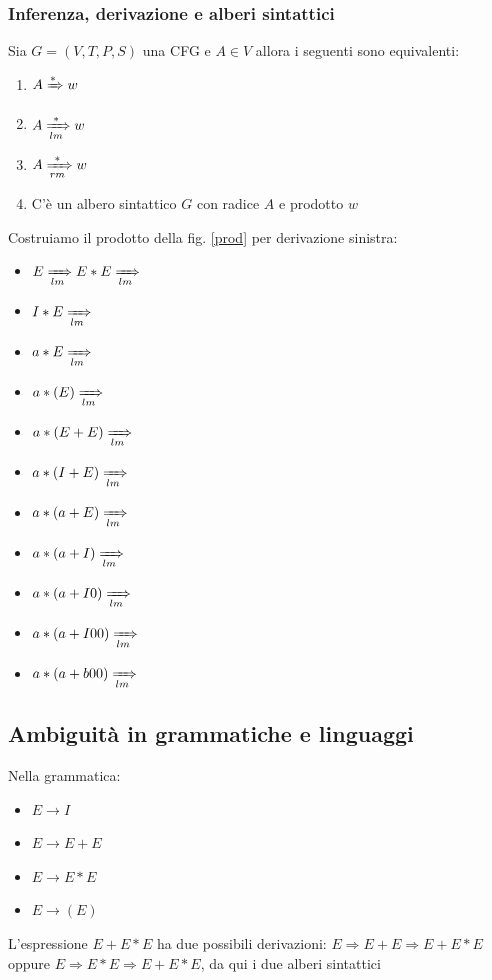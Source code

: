 \documentclass[12pt]{article}
\begin{document}
\subsubsection{Inferenza, derivazione e alberi sintattici}
Sia $G=(V,T,P,S)$ una CFG e $A \in V$ allora i seguenti sono equivalenti: 
\begin{enumerate}
  \item $A \xRightarrow[]{*} w$ 
  \item $A \xRightarrow[lm]{*} w$ 
  \item $A \xRightarrow[rm]{*} w$ 
  \item C'è un albero sintattico $G$ con radice $A$ e prodotto $w$
\end{enumerate}
Costruiamo il prodotto della fig. \ref{prod} per derivazione sinistra: 
\begin{itemize}
  \item $ E \xRightarrow[lm]{} E * E \xRightarrow[lm]{}$
  \item $ I * E \xRightarrow[lm]{} $
  \item $ a * E \xRightarrow[lm]{} $
  \item $ a * (E) \xRightarrow[lm]{} $
  \item $ a * (E+E) \xRightarrow[lm]{} $
  \item $ a * (I+E) \xRightarrow[lm]{} $
  \item $ a * (a+E) \xRightarrow[lm]{} $
  \item $ a * (a+I) \xRightarrow[lm]{} $
  \item $ a * (a+I0) \xRightarrow[lm]{} $
  \item $ a * (a+I00) \xRightarrow[lm]{} $
  \item $ a * (a+b00) \xRightarrow[lm]{} $
\end{itemize}

\subsection{Ambiguità in grammatiche e linguaggi}
Nella grammatica: 
\begin{itemize}
  \item $E \rightarrow I$ 
  \item $E \rightarrow E+E$ 
  \item $E \rightarrow E*E$ 
  \item $E \rightarrow (E)$ 
\end{itemize}
L'espressione $E+E*E$ ha due possibili derivazioni: 
$E \Rightarrow E + E \Rightarrow E + E * E$ oppure 
$E \Rightarrow E * E \Rightarrow E + E * E$, da qui i due alberi sintattici
\end{document}

